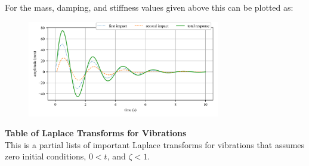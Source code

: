 \documentclass[12pt,a4paper]{article}
\begin{document}
For the mass, damping, and stiffness values given above this can be plotted as:
\begin{figure}[H]
	\centering
	\includegraphics[width=0.75\textwidth]{../../Figures/response_double_impact.png}
\end{figure}






\newpage




\pagestyle{empty}
\vspace{-20ex}
\begin{center}
{\large{}\textbf{Table of Laplace Transforms for Vibrations}} \\
\normalsize{} This is a partial lists of important Laplace transforms for vibrations that assumes \\ zero initial conditions, $0 < t$, and $\zeta < 1$.
\end{center}
\end{document}
